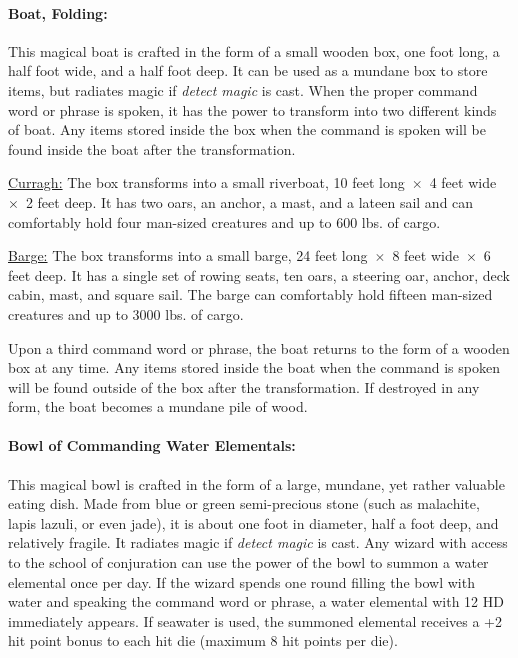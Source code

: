 \begin{multicols}{2}
\paragraph{Boat, Folding:} This magical boat is crafted in the form of a small wooden box, one foot long, a half foot wide, and a half foot deep.  It can be used as a mundane box to store items, but radiates magic if \textit{detect magic} is cast.  When the proper command word or phrase is spoken, it has the power to transform into two different kinds of boat.  Any items stored inside the box when the command is spoken will be found inside the boat after the transformation.

\underline{Curragh:} The box transforms into a small riverboat, 10 feet long~$\times$~4 feet wide~$\times$~2 feet deep.  It has two oars, an anchor, a mast, and a lateen sail and can comfortably hold four man-sized creatures and up to 600 lbs. of cargo.

\underline{Barge:} The box transforms into a small barge, 24 feet long~$\times$~8 feet wide~$\times$~6 feet deep.  It has a single set of rowing seats, ten oars, a steering oar, anchor, deck cabin, mast, and square sail.  The barge can comfortably hold fifteen man-sized creatures and up to 3000 lbs. of cargo.

Upon a third command word or phrase, the boat returns to the form of a wooden box at any time.  Any items stored inside the boat when the command is spoken will be found outside of the box after the transformation.  If destroyed in any form, the boat becomes a mundane pile of wood.

\paragraph{Bowl of Commanding Water Elementals:} This magical bowl is crafted in the form of a large, mundane, yet rather valuable eating dish.  Made from blue or green semi-precious stone (such as malachite, lapis lazuli, or even jade), it is about one foot in diameter, half a foot deep, and relatively fragile.  It radiates magic if \textit{detect magic} is cast.  Any wizard with access to the school of conjuration can use the power of the bowl to summon a water elemental once per day.  If the wizard spends one round filling the bowl with water and speaking the command word or phrase, a water elemental with 12 HD immediately appears.  If seawater is used, the summoned elemental receives a +2 hit point bonus to each hit die (maximum 8 hit points per die).


\end{multicols}
